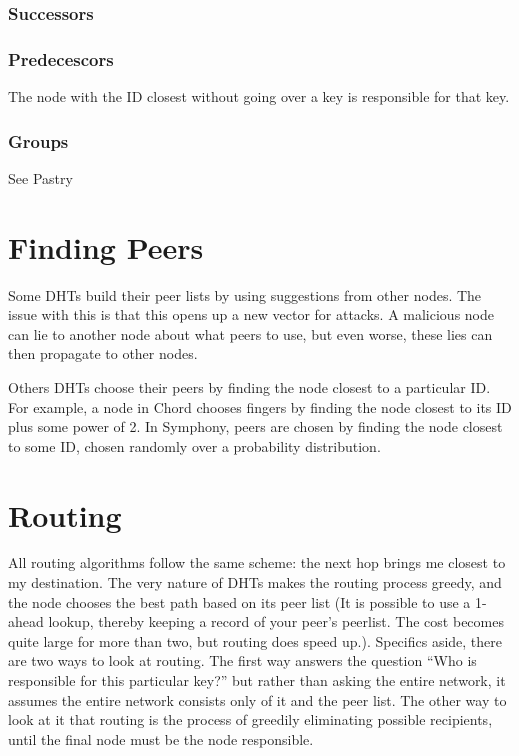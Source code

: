 \documentclass[10pt,letterpaper]{report}
\begin{document}
\subsubsection{Successors}


\subsubsection{Predecescors}
The node with the ID closest without going over a key is responsible for that key.


\subsubsection{Groups}

See Pastry


\section{Finding Peers}

Some DHTs build their peer lists by using suggestions from other nodes.  The issue with this is that this opens up a new vector for attacks.   A malicious node can lie to another node about what peers to use, but even worse, these lies can then propagate to other nodes.

Others DHTs choose their peers by finding the node closest to a particular ID.  For example, a node in Chord chooses fingers by finding the node closest to its ID plus some  power of 2.    In Symphony, peers are chosen by finding the node closest to some ID, chosen randomly over a probability distribution.



\section{Routing}
All routing algorithms follow the same scheme:  the next hop  brings me closest to my destination.  The very nature of DHTs makes the routing process greedy, and the node chooses the best path based on its peer list (It is possible to use a 1-ahead lookup, thereby keeping a record of your peer's peerlist.  The cost becomes quite large for more than two, but routing does speed up.).  Specifics aside, there are two ways to look at routing.  The first way  answers the question ``Who is responsible for this particular key?''  but rather than asking the entire network, it assumes the entire network consists only of it and the peer list.  The other way to look at it that routing is the process of greedily  eliminating possible recipients, until the final node must be the node responsible.  
\end{document}
